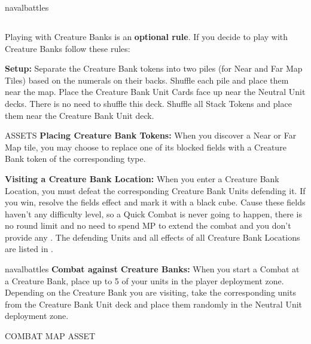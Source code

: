 \begin{multicols*}{2}
\vspace*{\fill}

\begin{expansion}{navalbattles}
	\subsection*{}
	Playing with Creature Banks is an \textbf{optional rule}. If you decide to play with Creature Banks follow these rules:\par
	\vspace*{1em}
	\textbf{Setup:} Separate the Creature Bank tokens into two piles (for Near and Far Map Tiles) based on the numerals on their backs. Shuffle each pile and place them near the map.
	Place the Creature Bank Unit Cards face up near the Neutral Unit decks. There is no need to shuffle this deck. Shuffle all Stack Tokens and place them near the Creature Bank Unit deck.
	\vspace*{1em}
	
	ASSETS %
	\textbf{Placing Creature Bank Tokens:} When you discover a Near or Far Map tile, you may choose to replace one of its blocked fields with a Creature Bank token of the corresponding type.\par
	\vspace*{1em}
	\textbf{Visiting a Creature Bank Location:} When you enter a Creature Bank Location, you must defeat the corresponding Creature Bank Units defending it. If you win, resolve the fields effect and mark it with a black cube. Cause these fields haven't any difficulty level, so a Quick Combat is never going to happen, there is no round limit and no need to spend MP to extend the combat and you don't provide any . The defending Units and all effects of all Creature Bank Locations are listed in .
	\vspace*{1em}
	\end{expansion}
	\begin{expansion}{navalbattles}
	\textbf{Combat against Creature Banks:} When you start a Combat at a Creature Bank, place up to 5 of your units in the player deployment zone. Depending on the Creature Bank you are visiting, take the corresponding units from the Creature Bank Unit deck and place them randomly in the Neutral Unit deployment zone. 
	
	COMBAT MAP ASSET
	

\end{expansion}
\end{multicols*}
